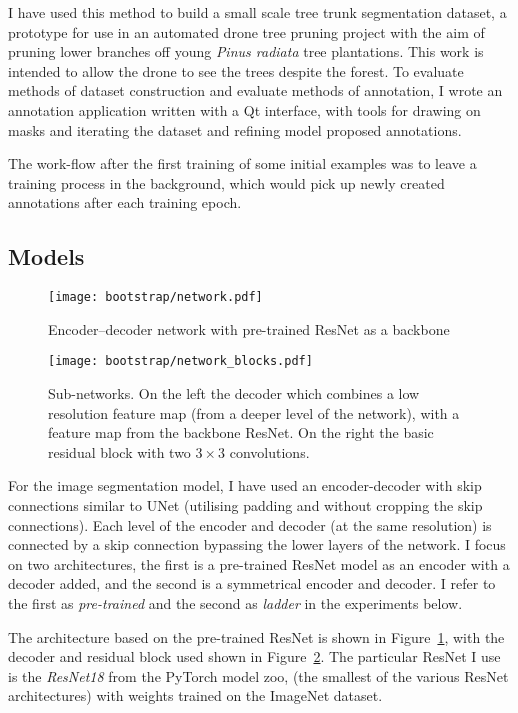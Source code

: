 I have used this method to build a small scale tree trunk segmentation dataset, a prototype for use in an automated drone tree pruning project with the aim of pruning lower branches off young \emph{Pinus radiata} tree plantations. This work is intended to allow the drone to see the trees despite the forest. To evaluate methods of dataset construction and evaluate methods of annotation, I wrote an annotation application written with a Qt interface, with tools for drawing on masks and iterating the dataset and refining model proposed annotations.

The work-flow after the first training of some initial  examples was to leave a training process in the background, which would pick up newly created annotations after each training epoch. 

\subsection {Models}

\begin{figure}[h]
  \centering
  \texttt{[image: bootstrap/network.pdf]}
  \caption{Encoder--decoder network with pre-trained ResNet as a backbone}  
  \label{fig:bootstrap_network}
\end{figure}
\begin{figure}
  \centering
  \texttt{[image: bootstrap/network\_blocks.pdf]}
  \caption{Sub-networks. On the left the decoder which combines a low resolution feature map (from a deeper level of the network), with a feature map from the backbone ResNet. On the right the basic residual block with two $3\times3$ convolutions. }  
  \label{fig:bootstrap_decode_block}
\end{figure}

For the image segmentation model, I have used an encoder-decoder with skip connections similar to UNet \cite{Ronneberger2015} (utilising padding and without cropping the skip connections). Each level of the encoder and decoder (at the same resolution) is connected by a skip connection bypassing the lower layers of the network. I focus on two architectures, the first is a pre-trained ResNet model as an encoder with a decoder added, and the second is a symmetrical encoder and decoder. I refer to the first as \emph{pre-trained} and the second as \emph{ladder} in the experiments below.

The architecture based on the pre-trained ResNet \cite{He} is shown in Figure~\ref{fig:bootstrap_network}, with the decoder and residual block used shown in Figure~\ref{fig:bootstrap_decode_block}. The particular ResNet I use is the \emph{ResNet18} from the PyTorch \cite{Paszke2017} model zoo, (the smallest of the various ResNet architectures) with weights trained on the ImageNet dataset. 

